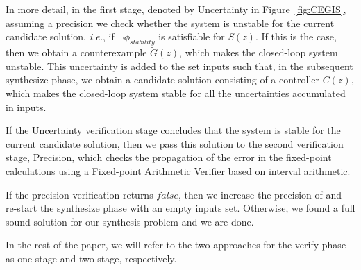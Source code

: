 \documentclass{sig-alternate-05-2015}
\newcommand{\red}[1]{{\color{red}#1}}
\begin{document}
%
%
In more detail, in the first stage, denoted by {\sc Uncertainty} in Figure~\ref{fig:CEGIS}, 
assuming a precision  
we check whether the system is unstable for the current candidate solution,
{\it i.e.}, if $\neg \phi_\mathit{stability}$ is satisfiable for $S(z)$.
If this is the case, then we obtain a counterexample 
$\tilde G(z)$, 
which makes the closed-loop system unstable. 
This uncertainty is added to 
the set {\sc inputs} such that, in the subsequent {\sc synthesize} phase, 
we obtain a candidate solution consisting 
of a controller $C(z)$, which makes the closed-loop 
system stable for all the uncertainties accumulated in {\sc inputs}.

If the {\sc Uncertainty} verification stage concludes that
the system is stable for the current candidate solution,
then we pass this solution to the second verification stage, {\sc Precision}, 
which checks the propagation of the error in the fixed-point 
calculations using a Fixed-point Arithmetic Verifier based on 
interval arithmetic. 
%
%

If the {\sc precision} verification returns $\mathit{false}$, then we
increase the precision of  and re-start the {\sc
  synthesize} phase with an empty {\sc inputs} set.  Otherwise, we
found a full sound solution for our synthesis problem and we are done.

In the rest of the paper, we will refer to the two approaches 
for the {\sc verify} phase as one-stage and two-stage, respectively.

\end{document}
